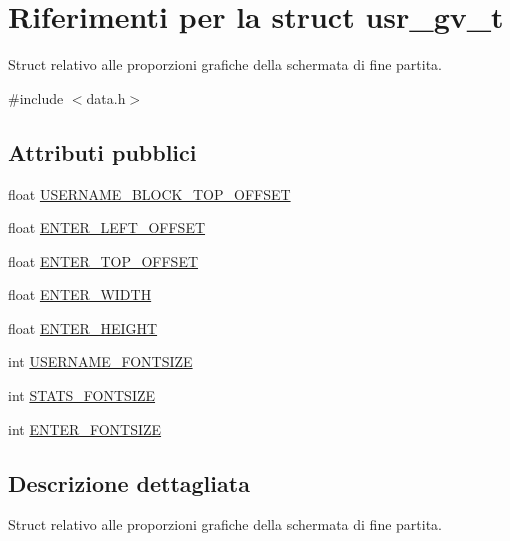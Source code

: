 \hypertarget{structusr__gv__t}{}\section{Riferimenti per la struct usr\+\_\+gv\+\_\+t}
\label{structusr__gv__t}


Struct relativo alle proporzioni grafiche della schermata di fine partita.  




{\ttfamily \#include $<$data.\+h$>$}

\subsection*{Attributi pubblici}
\begin{DoxyCompactItemize}
\item 
float \hyperlink{structusr__gv__t_a6771f8678ff677e94db59138b3cb322d}{U\+S\+E\+R\+N\+A\+M\+E\+\_\+\+B\+L\+O\+C\+K\+\_\+\+T\+O\+P\+\_\+\+O\+F\+F\+S\+ET}
\item 
float \hyperlink{structusr__gv__t_ad9f2d3a263b00fe3318e7d6e58937c6f}{E\+N\+T\+E\+R\+\_\+\+L\+E\+F\+T\+\_\+\+O\+F\+F\+S\+ET}
\item 
float \hyperlink{structusr__gv__t_afba7f0e6539eb98ac504e466d8ae7497}{E\+N\+T\+E\+R\+\_\+\+T\+O\+P\+\_\+\+O\+F\+F\+S\+ET}
\item 
float \hyperlink{structusr__gv__t_a4f72cddaa03f366b05af169b6cc6e57f}{E\+N\+T\+E\+R\+\_\+\+W\+I\+D\+TH}
\item 
float \hyperlink{structusr__gv__t_a5630e2937541909c51c67e17a9006fe0}{E\+N\+T\+E\+R\+\_\+\+H\+E\+I\+G\+HT}
\item 
int \hyperlink{structusr__gv__t_a9f98fe0caf526ac025f34b2767f763d7}{U\+S\+E\+R\+N\+A\+M\+E\+\_\+\+F\+O\+N\+T\+S\+I\+ZE}
\item 
int \hyperlink{structusr__gv__t_a56f1871d5de77a092900916d70d62d28}{S\+T\+A\+T\+S\+\_\+\+F\+O\+N\+T\+S\+I\+ZE}
\item 
int \hyperlink{structusr__gv__t_a5f34421e0029b76550de152894ebf2ef}{E\+N\+T\+E\+R\+\_\+\+F\+O\+N\+T\+S\+I\+ZE}
\end{DoxyCompactItemize}


\subsection{Descrizione dettagliata}
Struct relativo alle proporzioni grafiche della schermata di fine partita. 

